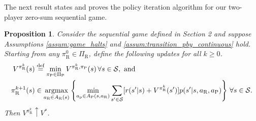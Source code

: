 \documentclass[aoas]{imsart}
\theoremstyle{plain}
\newtheorem{proposition}[theorem]{Proposition}
\theoremstyle{definition}
\newcommand{\defeq}{\stackrel{\text{def}}{=}}
\newcommand{\argmax}{\operatornamewithlimits{argmax}}
\begin{document}
    The next result states and proves the policy iteration algorithm for our two-player zero-sum sequential game.
       \begin{proposition}
           \label{lem:policy_iteration}
           Consider the sequential game defined in Section 2 and suppose Assumptions \ref{assum:game_halts} and \ref{assum:transition_pby_continuous} hold. Starting from any $\pi_\text{R}^0 \in \Pi_\text{R}$, define the following updates for all $k \geq 0$.
           \begin{align*}
              V^{\pi_{\text{R}}^k}(s) &\defeq \min_{\pi_\text{P} \in \Pi_\text{P}} V^{\pi_\text{R}^k,\pi_\text{P}}(s) \, \forall s \in \mathcal{S}, \mbox{ and}\\
              \label{eqn:update-policy-two-player}
              \pi_\text{R}^{k+1}(s) &\in \argmax_{a_\text{R} \in A_\text{R}(s)} \left\{\min_{a_\text{p} \in A_\text{P}(s,a_\text{R})}\sum_{s' \in \mathcal{S}}[r(s'|s) + V^{\pi_{\text{R}}^k}(s')] p(s'|s,a_\text{R},a_\text{P})\right\} \,  \forall s \in \mathcal{S}.
            \end{align*}
            Then $V^{\pi_\text{R}^k} \uparrow V^*$. 
       \end{proposition}
\end{document}
